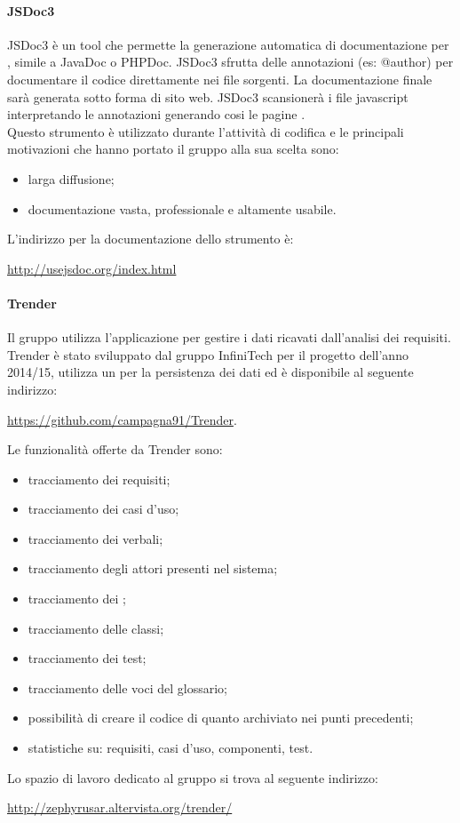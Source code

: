 				\paragraph{JSDoc3} \label{sec:jsdoc}
				JSDoc3 è un tool che permette la generazione automatica di documentazione per , simile a JavaDoc o PHPDoc. JSDoc3 sfrutta delle annotazioni (es: @author) per documentare il codice direttamente nei file sorgenti. La documentazione finale sarà generata sotto forma di sito web. JSDoc3 scansionerà i file javascript interpretando le annotazioni generando cosi le pagine . \\
				Questo strumento è utilizzato durante l'attività di codifica e le principali motivazioni che hanno portato il gruppo alla sua scelta sono:
				\begin{itemize}
					\item larga diffusione;
					\item documentazione vasta, professionale e altamente usabile.
				\end{itemize}
				L'indirizzo per la documentazione dello strumento è:
				\begin{center}
					\url{http://usejsdoc.org/index.html}
				\end{center}
				\paragraph{Trender}\label{sec:trender}
				Il gruppo utilizza l'applicazione  per gestire i dati ricavati dall'analisi dei requisiti. Trender è stato sviluppato dal gruppo InfiniTech per il progetto dell'anno 2014/15, utilizza un   per la persistenza dei dati ed è disponibile al seguente indirizzo:
				\begin{center}
					\url{https://github.com/campagna91/Trender}.
				\end{center}
				Le funzionalità offerte da Trender sono:
				\begin{itemize}
					\item tracciamento dei requisiti;
					\item tracciamento dei casi d’uso;
					\item tracciamento dei verbali;
					\item tracciamento degli attori presenti nel sistema;
					\item tracciamento dei ;
					\item tracciamento delle classi;
					\item tracciamento dei test;
					\item tracciamento delle voci del glossario;
					\item possibilità di creare il codice  di quanto archiviato nei punti precedenti;
					\item statistiche su: requisiti, casi d'uso, componenti, test.
				\end{itemize}
				Lo spazio di lavoro dedicato al gruppo si trova al seguente indirizzo:
				\begin{center}
					\url{http://zephyrusar.altervista.org/trender/}
				\end{center}
